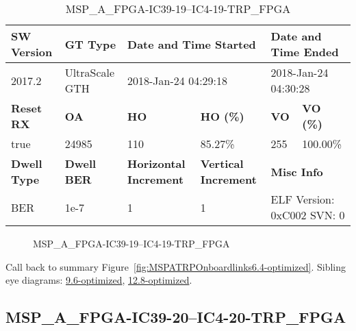 \begin{table}[h]
\centering
\caption{MSP\_A\_FPGA-IC39-19--IC4-19-TRP\_FPGA}
\label{tab:MSPAFPGAIC3919IC419TRPFPGA6.4-optimized}
\begin{tabular}{@{}|l|l|l|l|l|l|@{}}
\toprule
\textbf{SW Version}                & \textbf{GT Type}   & \multicolumn{2}{l|}{\textbf{Date and Time Started}}            & \multicolumn{2}{l|}{\textbf{Date and Time Ended}}        \\ \midrule
2017.2                       & UltraScale GTH          & \multicolumn{2}{l|}{2018-Jan-24 04:29:18}                   & \multicolumn{2}{l|}{2018-Jan-24 04:30:28}               \\ \midrule
\textbf{Reset RX}                  & \textbf{OA} & \textbf{HO}   & \textbf{HO (\%)} & \textbf{VO} & \textbf{VO (\%)} \\ \midrule
true & 24985        & 110          & 85.27\%        & 255        & 100.00\%       \\ \midrule
\textbf{Dwell Type}                & \textbf{Dwell BER} & \textbf{Horizontal Increment} & \textbf{Vertical Increment}    & \multicolumn{2}{l|}{\textbf{Misc Info}}                  \\ \midrule
BER                            & 1e-7        & 1        & 1           & \multicolumn{2}{l|}{ELF Version: 0xC002 SVN: 0}                         \\ \bottomrule
\end{tabular}
\end{table}

\begin{figure}[h]
\caption{MSP\_A\_FPGA-IC39-19--IC4-19-TRP\_FPGA} \label{fig:MSPAFPGAIC3919IC419TRPFPGA6.4-optimized}
\end{figure}

Call back to summary Figure~\ref{fig:MSPATRPOnboardlinks6.4-optimized}.
Sibling eye diagrams: \hyperref[sec:MSPAFPGAIC3919IC419TRPFPGA9.6-optimized]{9.6-optimized}, \hyperref[sec:MSPAFPGAIC3919IC419TRPFPGA12.8-optimized]{12.8-optimized}.

\clearpage
\newpage


\subsection{MSP\_A\_FPGA-IC39-20--IC4-20-TRP\_FPGA}\label{sec:MSPAFPGAIC3920IC420TRPFPGA6.4-optimized}

